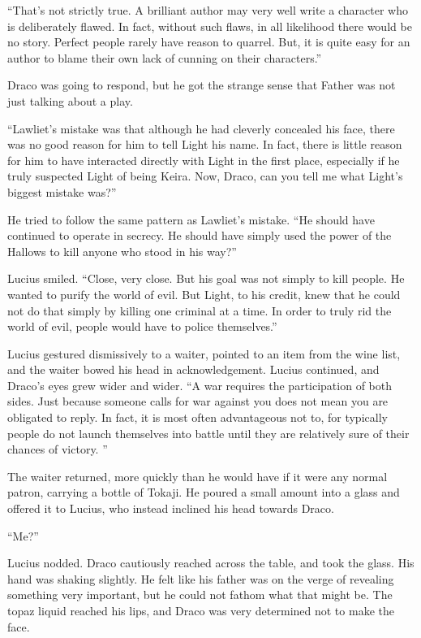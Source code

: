 “That’s not strictly true. A brilliant author may very well write a character who is deliberately flawed. In fact, without such flaws, in all likelihood there would be no story. Perfect people rarely have reason to quarrel. But, it is quite easy for an author to blame their own lack of cunning on their characters.”

Draco was going to respond, but he got the strange sense that Father was not just talking about a play.

“Lawliet’s mistake was that although he had cleverly concealed his face, there was no good reason for him to tell Light his name. In fact, there is little reason for him to have interacted directly with Light in the first place, especially if he truly suspected Light of being Keira. Now, Draco, can you tell me what Light’s biggest mistake was?”

He tried to follow the same pattern as Lawliet’s mistake. “He should have continued to operate in secrecy. He should have simply used the power of the Hallows to kill anyone who stood in his way?”

Lucius smiled. “Close, very close. But his goal was not simply to kill people. He wanted to purify the world of evil. But Light, to his credit, knew that he could not do that simply by killing one criminal at a time. In order to truly rid the world of evil, people would have to police themselves.”

Lucius gestured dismissively to a waiter, pointed to an item from the wine list, and the waiter bowed his head in acknowledgement. Lucius continued, and Draco’s eyes grew wider and wider. “A war requires the participation of both sides. Just because someone calls for war against you does not mean you are obligated to reply. In fact, it is most often advantageous not to, for typically people do not launch themselves into battle until they are relatively sure of their chances of victory. ”

The waiter returned, more quickly than he would have if it were any normal patron, carrying a bottle of Tokaji. He poured a small amount into a glass and offered it to Lucius, who instead inclined his head towards Draco.

“Me?”

Lucius nodded. Draco cautiously reached across the table, and took the glass. His hand was shaking slightly. He felt like his father was on the verge of revealing something very important, but he could not fathom what that might be. The topaz liquid reached his lips, and Draco was very determined not to make the face.

